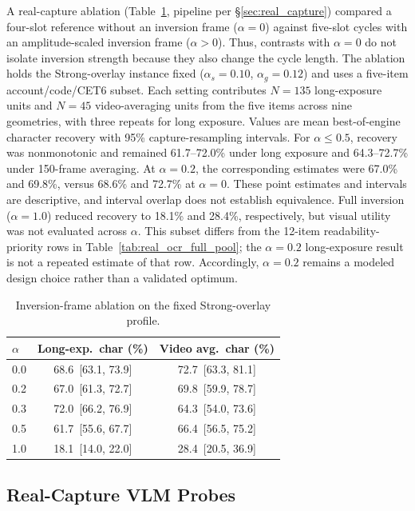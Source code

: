 \documentclass{ieeeaccess}
\begin{document}
A real-capture ablation (Table~\ref{tab:inversion_ablation}, pipeline per \S\ref{sec:real_capture}) compared a four-slot reference without an inversion frame ($\alpha=0$) against five-slot cycles with an amplitude-scaled inversion frame ($\alpha>0$). Thus, contrasts with $\alpha=0$ do not isolate inversion strength because they also change the cycle length. The ablation holds the Strong-overlay instance fixed ($\alpha_s=0.10$, $\alpha_g=0.12$) and uses a five-item account/code/CET6 subset. Each setting contributes $N=135$ long-exposure units and $N=45$ video-averaging units from the five items across nine geometries, with three repeats for long exposure. Values are mean best-of-engine character recovery with 95\% capture-resampling intervals. For $\alpha\leq0.5$, recovery was nonmonotonic and remained 61.7--72.0\% under long exposure and 64.3--72.7\% under 150-frame averaging. At $\alpha=0.2$, the corresponding estimates were 67.0\% and 69.8\%, versus 68.6\% and 72.7\% at $\alpha=0$. These point estimates and intervals are descriptive, and interval overlap does not establish equivalence. Full inversion ($\alpha=1.0$) reduced recovery to 18.1\% and 28.4\%, respectively, but visual utility was not evaluated across $\alpha$. This subset differs from the 12-item readability-priority rows in Table~\ref{tab:real_ocr_full_pool}; the $\alpha=0.2$ long-exposure result is not a repeated estimate of that row. Accordingly, $\alpha=0.2$ remains a modeled design choice rather than a validated optimum.

\begin{table}[!t]
\caption{Inversion-frame ablation on the fixed Strong-overlay profile.}
\label{tab:inversion_ablation}
\centering
\footnotesize
\begin{tabular}{lcc}
\toprule
$\alpha$ & Long-exp.\ char (\%) & Video avg.\ char (\%) \\
\midrule
0.0 & 68.6~[63.1, 73.9] & 72.7~[63.3, 81.1] \\
0.2 & 67.0~[61.3, 72.7] & 69.8~[59.9, 78.7] \\
0.3 & 72.0~[66.2, 76.9] & 64.3~[54.0, 73.6] \\
0.5 & 61.7~[55.6, 67.7] & 66.4~[56.5, 75.2] \\
1.0 & 18.1~[14.0, 22.0] & 28.4~[20.5, 36.9] \\
\bottomrule
\end{tabular}
\end{table}

\subsection{Real-Capture VLM Probes}
\label{sec:vlm}
\end{document}
